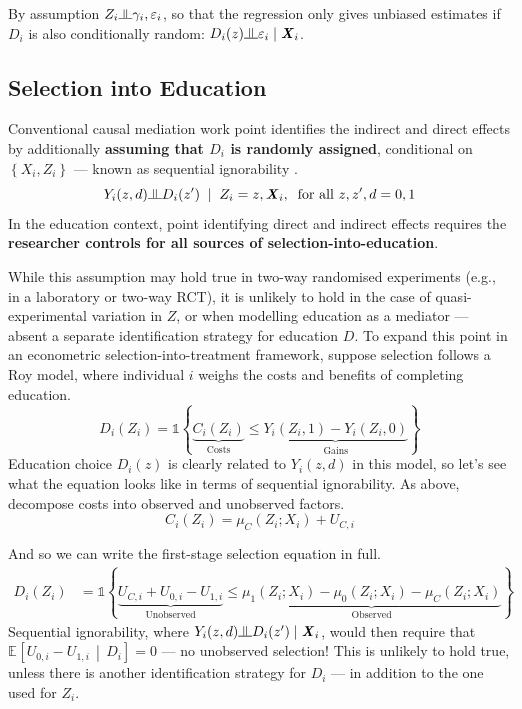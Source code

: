 \documentclass[a4paper, 12pt]{article}                                     %
\renewcommand{\vec}[1]{\boldsymbol{\mathit{#1}}}                           %
\newcommand{\Egiven}[3][]{\mathbb{E}_{#1} \left[ #2 \, \middle\vert \, #3 \right]} %
\newcommand{\indicator}[1]{\mathds{1}\left\{ #1 \right\}}                  %
\newcommand{\indep}{\raisebox{0.05em}{\rotatebox[origin=c]{90}{$\models$}}}%
\begin{document}
By assumption $Z_i \indep \gamma_i, \varepsilon_i$, so that the regression only gives unbiased estimates if $D_i$ is also conditionally random: $D_i(z)\indep \varepsilon_i \; | \; \vec X_i$.

\subsection{Selection into Education}
Conventional causal mediation work point identifies the indirect and direct effects by additionally \textbf{assuming that $D_i$ is randomly assigned}, conditional on $\left\{ \vec X_i, Z_i \right\}$ --- known as 
sequential ignorability \citep{imai2010identification}.
\[ Y_i(z, d) \indep D_i(z') \;\; | \;\; Z_i = z, \vec X_i, \;\;
    \text{for all } z, z', d = 0, 1 \]
In the education context, point identifying direct and indirect effects requires the \textbf{researcher controls for all sources of selection-into-education}.

While this assumption may hold true in two-way randomised experiments (e.g., in a laboratory or two-way RCT), it is unlikely to hold in the case of quasi-experimental variation in $Z$, or when modelling education as a mediator --- absent a separate identification strategy for education $D$.
To expand this point in an econometric selection-into-treatment framework, suppose selection follows a Roy model, where individual $i$ weighs the costs and benefits of completing education.
\[ D_i(Z_i) = \indicator{
    \underbrace{C_i(Z_i)}_{\text{Costs}}
    \leq
    \underbrace{Y_i(Z_i, 1) - Y_i(Z_i, 0)}_{\text{Gains}}} \]
Education choice $D_i(z)$ is clearly related to $Y_i(z, d)$ in this model, so let's see what the equation looks like in terms of sequential ignorability.
As above, decompose costs into observed and unobserved factors.
\[ C_i(Z_i) = \mu_{C}(Z_i; \vec X_i) + U_{C,i} \]

And so we can write the first-stage selection equation in full.
\begin{align*}
    D_i(Z_i) &= \indicator{
        \underbrace{U_{C, i} + U_{0, i} - U_{1, i}}_{\text{Unobserved}}
        \leq
        \underbrace{
            \mu_1(Z_i; \vec X_i) - \mu_0(Z_i; \vec X_i)- \mu_C(Z_i; \vec X_i)}_{\text{Observed}}}
\end{align*}
Sequential ignorability, where $Y_i(z, d) \indep D_i(z') \; | \; \vec X_i$, would then require that $\Egiven{U_{0, i} - U_{1, i}}{D_i} = 0$ --- no unobserved selection!
This is unlikely to hold true, unless there is another identification strategy for $D_i$ --- in addition to the one used for $Z_i$.
\end{document}

